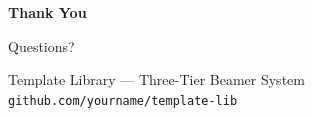 \documentclass[aspectratio=169,10pt]{beamer}
\begin{document}

\begin{frame}[plain]
  \vfill
  \centering
  {\Huge\bfseries\color{TLprimary} Thank You}
  
  \vspace{1em}
  {\large Questions?}
  
  \vspace{2em}
  {\small\color{TLinkSoft}
    Template Library — Three-Tier Beamer System\\
    \texttt{github.com/yourname/template-lib}
  }
  \vfill
\end{frame}
\end{document}
